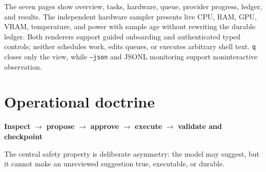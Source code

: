 \documentclass[11pt,a4paper]{article}
\newcommand{\pathcode}[1]{\texttt{#1}}
\begin{document}
\begin{center}
\end{center}

The seven pages show overview, tasks, hardware, queue, provider progress,
ledger, and results. The independent hardware sampler presents live CPU, RAM,
GPU, VRAM, temperature, and power with sample age without rewriting the durable
ledger. Both renderers support guided onboarding and authenticated typed
controls; neither schedules work, edits queues, or executes arbitrary shell
text. \pathcode{q} closes only the view, while \pathcode{--json} and JSONL
monitoring support noninteractive observation.

\section*{Operational doctrine}

\begin{center}
\textcolor{leafgreen}{\textbf{Inspect}} \(\rightarrow\)
\textcolor{leafviolet}{\textbf{propose}} \(\rightarrow\)
\textcolor{leafgold}{\textbf{approve}} \(\rightarrow\)
\textcolor{leafblue}{\textbf{execute}} \(\rightarrow\)
\textcolor{leafcoral}{\textbf{validate and checkpoint}}
\end{center}

The central safety property is deliberate asymmetry: the model may suggest,
but it cannot make an unreviewed suggestion true, executable, or durable.
\end{document}
